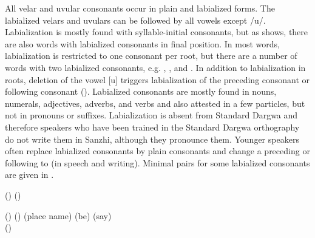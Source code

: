 All velar and uvular consonants occur in plain and labialized forms. The labialized velars and uvulars can be followed by all vowels except /u/. Labialization is mostly found with syllable-initial consonants, but as  shows, there are also words with labialized consonants in final position. In most words, labialization is restricted to one consonant per root, but there are a number of words with two labialized consonants, e.g.  ,  , and  . In addition to labialization in roots, deletion of the vowel [u] triggers labialization of the preceding consonant or following consonant (). Labialized consonants are mostly found in nouns, numerals, adjectives, adverbs, and verbs and also attested in a few particles, but not in pronouns or suffixes. Labialization is absent from Standard Dargwa and therefore speakers who have been trained in the Standard Dargwa orthography do not write them in Sanzhi, although they pronounce them. Younger speakers often replace labialized consonants by plain consonants and change a preceding or following  to  (in speech and writing). Minimal pairs for some labialized consonants are given in .
%
\begin{exe}
	\ex	\label{ex:labialization phon@A}
	\begin{xlist}
		\TabPositions{14em}
		\ex	{} () 	\tab {} () \label{ex:delqij phon}
		
		\ex	{} () 	\tab {} () 	\label{ex:bixwij phon}
		\ex	{}  (place name)	\tab {}  (be) \label{ex:akri phon}
		\ex	{} 	\tab {} 	(say) \label{ex:ikwij phon}\\
		() 
	\end{xlist}
\end{exe}

